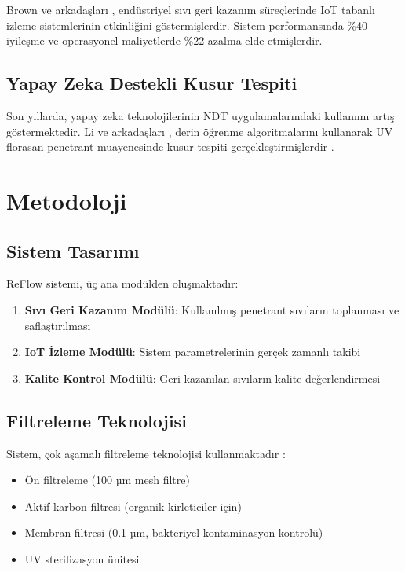 \documentclass[12pt,a4paper]{article}
\begin{document}
Brown ve arkadaşları \cite{brown2020iot}, endüstriyel sıvı geri kazanım süreçlerinde IoT tabanlı izleme sistemlerinin etkinliğini göstermişlerdir. Sistem performansında \%40 iyileşme ve operasyonel maliyetlerde \%22 azalma elde etmişlerdir.

\subsection{Yapay Zeka Destekli Kusur Tespiti}

Son yıllarda, yapay zeka teknolojilerinin NDT uygulamalarındaki kullanımı artış göstermektedir. Li ve arkadaşları \cite{li2019deep}, derin öğrenme algoritmalarını kullanarak UV florasan penetrant muayenesinde kusur tespiti gerçekleştirmişlerdir \cite{watson2020machine}.

\section{Metodoloji}

\subsection{Sistem Tasarımı}

ReFlow sistemi, üç ana modülden oluşmaktadır:

\begin{enumerate}
\item \textbf{Sıvı Geri Kazanım Modülü}: Kullanılmış penetrant sıvıların toplanması ve saflaştırılması
\item \textbf{IoT İzleme Modülü}: Sistem parametrelerinin gerçek zamanlı takibi
\item \textbf{Kalite Kontrol Modülü}: Geri kazanılan sıvıların kalite değerlendirmesi
\end{enumerate}

\subsection{Filtreleme Teknolojisi}

Sistem, çok aşamalı filtreleme teknolojisi kullanmaktadır \cite{zhang2018filtration}:

\begin{itemize}
\item Ön filtreleme (100 µm mesh filtre)
\item Aktif karbon filtresi (organik kirleticiler için)
\item Membran filtresi (0.1 µm, bakteriyel kontaminasyon kontrolü)
\item UV sterilizasyon ünitesi
\end{itemize}
\end{document}
